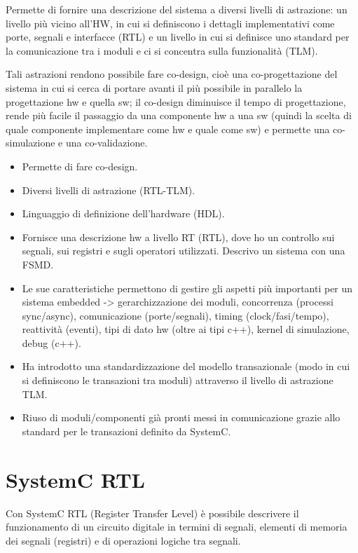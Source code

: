 \documentclass[a4paper]{article}
\begin{document}
		\noindent
		Permette di fornire una descrizione del sistema a diversi livelli di astrazione: un livello più vicino all'HW, in cui si definiscono i dettagli implementativi come porte, segnali e interfacce (RTL) e un livello in cui si definisce uno standard per la comunicazione tra i moduli e ci si concentra sulla funzionalità (TLM).
		\bigskip
		
		\noindent
		Tali astrazioni rendono possibile fare co-design, cioè una co-progettazione del sistema in cui si cerca di portare avanti il più possibile in parallelo la progettazione hw e quella sw; il co-design diminuisce il tempo di progettazione, rende più facile il passaggio da una componente hw a una sw (quindi la scelta di quale componente implementare come hw e quale come sw) e permette una co-simulazione e una co-validazione.
	\begin{itemize}
		\item Permette di fare co-design.
		\item Diversi livelli di astrazione (RTL-TLM).
		\item Linguaggio di definizione dell'hardware (HDL).
		\item Fornisce una descrizione hw a livello RT (RTL), dove ho un controllo sui segnali, sui registri e sugli operatori utilizzati. Descrivo un sistema con una FSMD.
		\item Le sue caratteristiche permettono di gestire gli aspetti più importanti per un sistema embedded -> gerarchizzazione dei moduli, concorrenza (processi sync/async), comunicazione (porte/segnali), timing (clock/fasi/tempo), reattività (eventi), tipi di dato hw (oltre ai tipi c++), kernel di simulazione, debug (c++).
		\item Ha introdotto una standardizzazione del modello transazionale (modo in cui si definiscono le transazioni tra moduli) attraverso il livello di astrazione TLM.
		\item Riuso di moduli/componenti già pronti messi in comunicazione grazie allo standard per le transazioni definito da SystemC.
	\end{itemize}
	
	\section{SystemC RTL}
		Con SystemC RTL (Register Transfer Level) è possibile descrivere il funzionamento di un circuito digitale in termini di segnali, elementi di memoria dei segnali (registri) e di operazioni logiche tra segnali.
		
\end{document}
